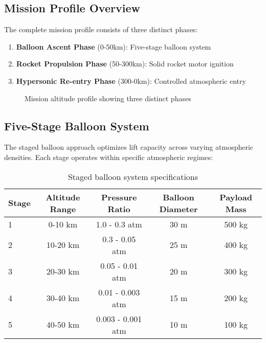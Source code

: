 \documentclass[11pt,a4paper]{article}
\begin{document}
\subsection{Mission Profile Overview}

The complete mission profile consists of three distinct phases:

\begin{enumerate}
    \item \textbf{Balloon Ascent Phase} (0-50km): Five-stage balloon system
    \item \textbf{Rocket Propulsion Phase} (50-300km): Solid rocket motor ignition
    \item \textbf{Hypersonic Re-entry Phase} (300-0km): Controlled atmospheric entry
\end{enumerate}

\begin{figure}[H]
\centering
{}
\caption{Mission altitude profile showing three distinct phases}
\label{fig:mission_profile}
\end{figure}

\subsection{Five-Stage Balloon System}

The staged balloon approach optimizes lift capacity across varying atmospheric densities. Each stage operates within specific atmospheric regimes:

\begin{table}[H]
\centering
\begin{tabular}{@{}lcccc@{}}
\toprule
\textbf{Stage} & \textbf{Altitude Range} & \textbf{Pressure Ratio} & \textbf{Balloon Diameter} & \textbf{Payload Mass} \\
\midrule
1 & 0-10 km & 1.0 - 0.3 atm & 30 m & 500 kg \\
2 & 10-20 km & 0.3 - 0.05 atm & 25 m & 400 kg \\
3 & 20-30 km & 0.05 - 0.01 atm & 20 m & 300 kg \\
4 & 30-40 km & 0.01 - 0.003 atm & 15 m & 200 kg \\
5 & 40-50 km & 0.003 - 0.001 atm & 10 m & 100 kg \\
\bottomrule
\end{tabular}
\caption{Staged balloon system specifications}
\label{tab:balloon_stages}
\end{table}
\end{document}
